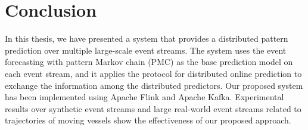 %	
%	
%	
%	


\section{Conclusion}

\par In this thesis, we have presented a system that provides a distributed pattern prediction over multiple large-scale event streams. The system uses the event forecasting with pattern Markov chain (PMC) \cite{alevizos2017event} as the base prediction model on each event stream, and it applies the protocol for distributed online prediction \cite{kamp2014communication} to exchange the information among the distributed predictors.  Our proposed system has been implemented using Apache Flink and Apache Kafka. Experimental results over synthetic event streams and large real-world event streams related to trajectories of moving vessels show the effectiveness of our proposed approach.